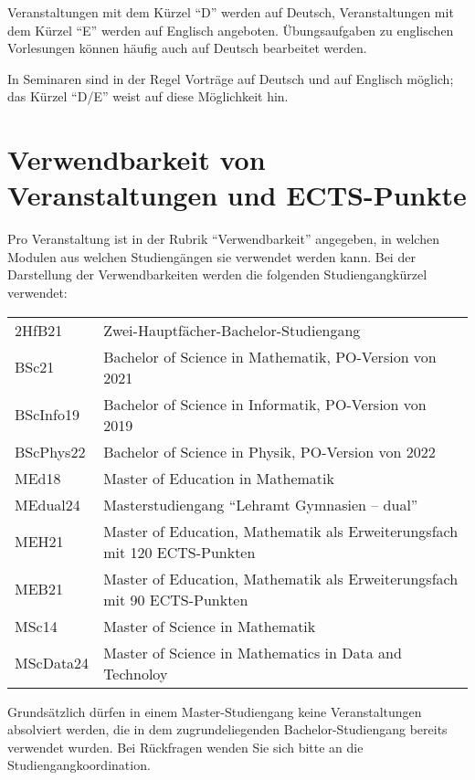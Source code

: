 \documentclass[a4paper,10pt]{article}
\begin{document}
Veranstaltungen mit dem Kürzel "`D"' werden auf Deutsch, 
Veranstaltungen mit dem Kürzel "`E"' werden auf Englisch angeboten.
Übungsaufgaben zu englischen Vorlesungen können häufig auch auf Deutsch bearbeitet werden.

In Seminaren sind in der Regel Vorträge auf Deutsch und auf Englisch möglich;
das Kürzel "`D/E"' weist auf diese Möglichkeit hin.



\section*{Verwendbarkeit von Veranstaltungen und ECTS-Punkte}


Pro Veranstaltung ist in der Rubrik "`Verwendbarkeit"' angegeben, 
in welchen Modulen aus welchen Studiengängen sie verwendet werden kann. 
Bei der Darstellung der Verwendbarkeiten werden die folgenden Studiengangkürzel verwendet:
\begin{center}
\begin{longtable}{ll}
        2HfB21 & Zwei-Hauptfächer-Bachelor-Studiengang \\
        BSc21 & Bachelor of Science in Mathematik, PO-Version von 2021 \\
        BScInfo19 & Bachelor of Science in Informatik, PO-Version von 2019 \\
        BScPhys22 & Bachelor of Science in Physik, PO-Version von 2022 \\
        MEd18 & Master of Education in Mathematik \\
        MEdual24 & Masterstudiengang "`Lehramt Gymnasien -- dual"' \\
        MEH21 & Master of Education, Mathematik als Erweiterungsfach mit 120 ECTS-Punkten \\
        MEB21 & Master of Education, Mathematik als Erweiterungsfach mit 90 ECTS-Punkten \\
        MSc14 & Master of Science in Mathematik \\        
        MScData24 & Master of Science in Mathematics in Data and Technoloy 
\end{longtable}
\end{center}
Grundsätzlich dürfen in einem Master-Studiengang keine Veranstaltungen absolviert werden,
die in dem zugrundeliegenden Bachelor-Studiengang bereits verwendet wurden.
Bei Rückfragen wenden Sie sich bitte an die Studiengangkoordination.
\end{document}

